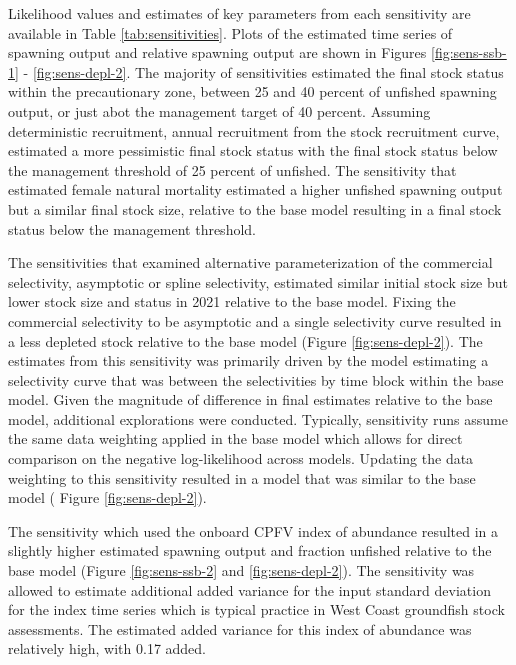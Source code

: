\documentclass[11pt,
  english,
  a4paper,
]{article}
\begin{document}

Likelihood values and estimates of key parameters from each sensitivity are available in Table \ref{tab:sensitivities}. Plots of the estimated time series of spawning output and relative spawning output are shown in Figures \ref{fig:sens-ssb-1} - \ref{fig:sens-depl-2}. The majority of sensitivities estimated the final stock status within the precautionary zone, between 25 and 40 percent of unfished spawning output, or just abot the management target of 40 percent. Assuming deterministic recruitment, annual recruitment from the stock recruitment curve, estimated a more pessimistic final stock status with the final stock status below the management threshold of 25 percent of unfished. The sensitivity that estimated female natural mortality estimated a higher unfished spawning output but a similar final stock size, relative to the base model resulting in a final stock status below the management threshold.

\leavevmode\tagmcend\tagstructend\par


The sensitivities that examined alternative parameterization of the commercial selectivity, asymptotic or spline selectivity, estimated similar initial stock size but lower stock size and status in 2021 relative to the base model. Fixing the commercial selectivity to be asymptotic and a single selectivity curve resulted in a less depleted stock relative to the base model (Figure \ref{fig:sens-depl-2}). The estimates from this sensitivity was primarily driven by the model estimating a selectivity curve that was between the selectivities by time block within the base model. Given the magnitude of difference in final estimates relative to the base model, additional explorations were conducted. Typically, sensitivity runs assume the same data weighting applied in the base model which allows for direct comparison on the negative log-likelihood across models. Updating the data weighting to this sensitivity resulted in a model that was similar to the base model ( Figure \ref{fig:sens-depl-2}).

\leavevmode\tagmcend\tagstructend\par


The sensitivity which used the onboard CPFV index of abundance resulted in a slightly higher estimated spawning output and fraction unfished relative to the base model (Figure \ref{fig:sens-ssb-2} and \ref{fig:sens-depl-2}). The sensitivity was allowed to estimate additional added variance for the input standard deviation for the index time series which is typical practice in West Coast groundfish stock assessments. The estimated added variance for this index of abundance was relatively high, with 0.17 added.
\end{document}
